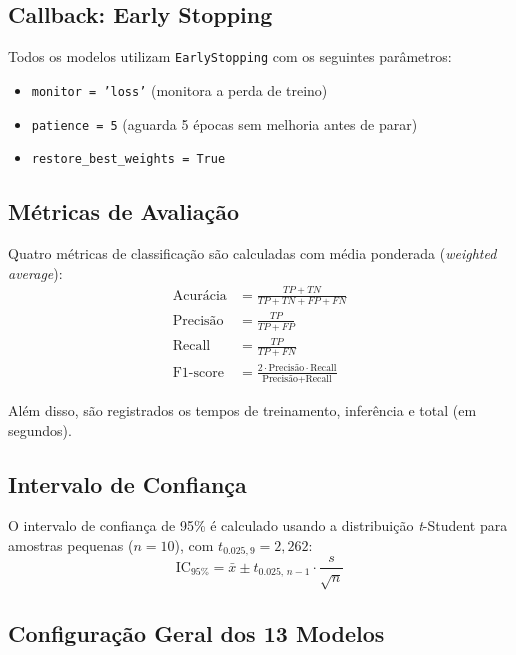 \documentclass[12pt,a4paper]{article}
\begin{document}
\subsection{Callback: Early Stopping}

Todos os modelos utilizam \texttt{EarlyStopping} com os seguintes parâmetros:
\begin{itemize}
  \item \texttt{monitor = 'loss'} (monitora a perda de treino)
  \item \texttt{patience = 5} (aguarda 5 épocas sem melhoria antes de parar)
  \item \texttt{restore\_best\_weights = True}
\end{itemize}

\subsection{Métricas de Avaliação}

Quatro métricas de classificação são calculadas com média ponderada (\emph{weighted average}):
\begin{align}
  \text{Acurácia}  &= \frac{TP + TN}{TP + TN + FP + FN} \\[4pt]
  \text{Precisão}  &= \frac{TP}{TP + FP} \\[4pt]
  \text{Recall}    &= \frac{TP}{TP + FN} \\[4pt]
  \text{F1-score}  &= \frac{2 \cdot \text{Precisão} \cdot \text{Recall}}{\text{Precisão} + \text{Recall}}
\end{align}

Além disso, são registrados os tempos de treinamento, inferência e total (em segundos).

\subsection{Intervalo de Confiança}

O intervalo de confiança de 95\% é calculado usando a distribuição \emph{t}-Student
para amostras pequenas ($n = 10$), com $t_{0.025, 9} = 2{,}262$:
\[
  \text{IC}_{95\%} = \bar{x} \pm t_{0.025,\,n-1} \cdot \dfrac{s}{\sqrt{n}}
\]

\subsection{Configuração Geral dos 13 Modelos}
\end{document}

